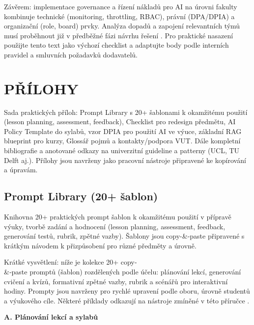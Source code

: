 \documentclass{report}%
\begin{document}
\medskip

Závěrem: implementace governance a řízení nákladů pro AI na úrovni fakulty kombinuje technické (monitoring, throttling, RBAC), právní (DPA/DPIA) a organizační (role, board) prvky. Analýza dopadů a zapojení relevantních týmů musí proběhnout již v předběžné fázi návrhu řešení \cite{kb_malinka_chatgpt_ve_vyuce_dva_roky_pote_2024_pdf_90bc3aaf_page_12_1}. Pro praktické nasazení použijte tento text jako výchozí checklist a adaptujte body podle interních pravidel a smluvních požadavků dodavatelů. \cite{kb_ai_101_tipu_pdf_04e4a115_page_54_1}%

%
\chapter{PŘÍLOHY}%
Sada praktických příloh: Prompt Library s 20+ šablonami k okamžitému použití (lesson planning, assessment, feedback), Checklist pro redesign předmětu, AI Policy Template do sylabů, vzor DPIA pro použití AI ve výuce, základní RAG blueprint pro kurzy, Glossář pojmů a kontakty/podpora VUT. Dále kompletní bibliografie a anotované odkazy na univerzitní guideline a patterny (UCL, TU Delft aj.). Přílohy jsou navrženy jako pracovní nástroje připravené ke kopírování a úpravám.%
\section{Prompt Library (20+ šablon)}%
Knihovna 20+ praktických prompt šablon k okamžitému použití v přípravě výuky, tvorbě zadání a hodnocení (lesson planning, assessment, feedback, generování testů, rubrik, zpětné vazby). Šablony jsou copy-\&-paste připravené s krátkým návodem k přizpůsobení pro různé předměty a úrovně.%


%
\medskip

Krátké vysvětlení: níže je kolekce 20+ copy‑\\ \&‑paste promptů (šablon) rozdělených podle účelu: plánování lekcí, generování cvičení a kvízů, formativní zpětné vazby, rubrik a scénářů pro interaktivní hodiny. Prompty jsou navrženy pro rychlé upravení podle oboru, úrovně studentů a výukového cíle. Některé příklady odkazují na nástroje zmíněné v této příručce \cite{kb_ai_101_tipu_pdf_04e4a115_page_15_2, kb_ai_101_tipu_pdf_04e4a115_page_8_1, kb_ai_101_tipu_pdf_04e4a115_page_7_1}.

\medskip

\textbf{A. Plánování lekcí a sylabů}
\end{document}
